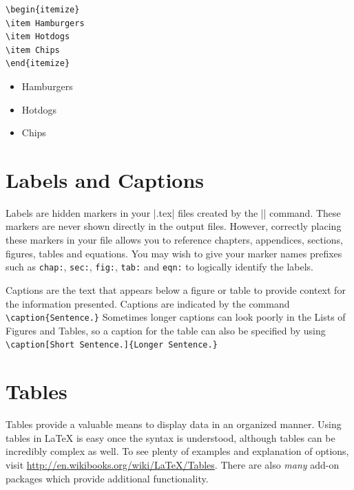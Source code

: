 \begin{minipage}{.45\textwidth}
\begin{Verbatim}
\begin{itemize}
\item Hamburgers
\item Hotdogs
\item Chips
\end{itemize}
\end{Verbatim}
\end{minipage}
\hfill
\begin{minipage}{.45\textwidth}
\begin{itemize}
\item Hamburgers
\item Hotdogs
\item Chips
\end{itemize}
\end{minipage}


\section{Labels and Captions}\label{sec:labels}
Labels are hidden markers in your |.tex| files created by the
|\label{name}| command.  These markers are never shown directly in the
output files.  However, correctly placing these markers in your file
allows you to reference chapters, appendices, sections, figures,
tables and equations.  You may wish to give your marker names prefixes
such as \texttt{chap:}, \texttt{sec:}, \texttt{fig:}, \texttt{tab:}
and \texttt{eqn:} to logically identify the labels.

Captions are the text that appears below a figure or table to provide
context for the information presented.  Captions are indicated by the
command \verb|\caption{Sentence.}| Sometimes longer captions can look
poorly in the Lists of Figures and Tables, so a caption for the table
can also be specified by using
\verb|\caption[Short Sentence.]{Longer Sentence.}|

\section{Tables}
Tables provide a valuable means to display data in an organized
manner.  Using tables in \LaTeX{} is easy once the syntax is
understood, although tables can be incredibly complex as well.  To see
plenty of examples and explanation of options, visit
\url{http://en.wikibooks.org/wiki/LaTeX/Tables}. There are also
\emph{many} add-on packages which provide additional functionality.

